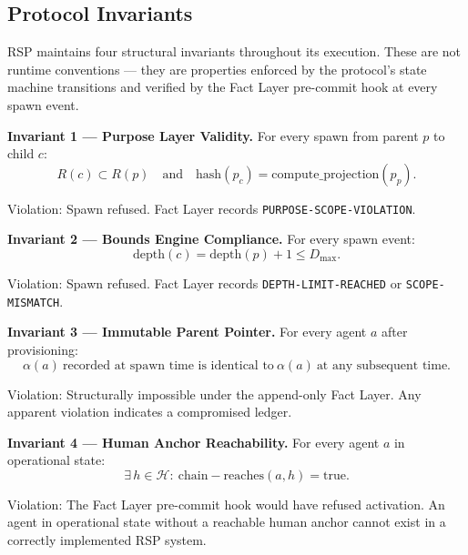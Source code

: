 \documentclass[12pt]{article}
\begin{document}
\subsection{Protocol Invariants}

RSP maintains four structural invariants throughout its execution. These are not runtime conventions — they are properties enforced by the protocol's state machine transitions and verified by the Fact Layer pre-commit hook at every spawn event.

\bigskip
\noindent\textbf{Invariant 1 — Purpose Layer Validity.} For every spawn from parent $p$ to child $c$:
\begin{equation}
R(c) \subset R(p)\quad \text{and} \quad \mathrm{hash}(p_c) = \mathrm{compute\_projection}(p_p).
\label{eq:rs-inv-purpose-validity}
\end{equation}

Violation: Spawn refused. Fact Layer records \texttt{PURPOSE-SCOPE-VIOLATION}.

\bigskip
\noindent\textbf{Invariant 2 — Bounds Engine Compliance.} For every spawn event:
\begin{equation}
\mathrm{depth}(c) = \mathrm{depth}(p) + 1 \leq D_{\max}.
\label{eq:rs-inv-bounds-compliance}
\end{equation}

Violation: Spawn refused. Fact Layer records \texttt{DEPTH-LIMIT-REACHED} or \texttt{SCOPE-MISMATCH}.

\bigskip
\noindent\textbf{Invariant 3 — Immutable Parent Pointer.} For every agent $a$ after provisioning:
\begin{equation}
\alpha(a)\ \text{recorded at spawn time is identical to}\ \alpha(a)\ \text{at any subsequent time}.
\label{eq:rs-inv-immutable-parent}
\end{equation}

Violation: Structurally impossible under the append-only Fact Layer. Any apparent violation indicates a compromised ledger.

\bigskip
\noindent\textbf{Invariant 4 — Human Anchor Reachability.} For every agent $a$ in operational state:
\begin{equation}
\exists\, h \in \mathcal{H}:\ \mathrm{chain-reaches}(a, h) = \mathrm{true}.
\label{eq:rs-inv-human-anchor}
\end{equation}

Violation: The Fact Layer pre-commit hook would have refused activation. An agent in operational state without a reachable human anchor cannot exist in a correctly implemented RSP system.
\end{document}
